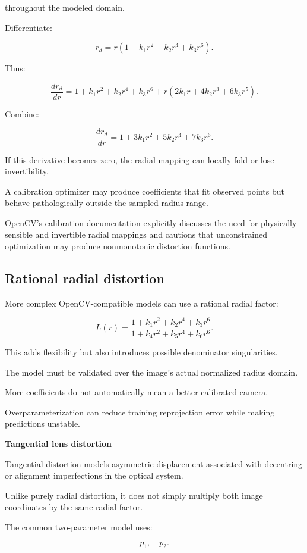 throughout the modeled domain.

Differentiate:

\[
 r_d=r(1+k_1r^2+k_2r^4+k_3r^6).
\]

Thus:

\[
 \frac{dr_d}{dr} = 1+k_1r^2+k_2r^4+k_3r^6 +r(2k_1r+4k_2r^3+6k_3r^5).
\]

Combine:

\[
 \boxed{ \frac{dr_d}{dr} = 1+3k_1r^2+5k_2r^4+7k_3r^6 }.
\]

If this derivative becomes zero, the radial mapping can locally fold or lose invertibility.

A calibration optimizer may produce coefficients that fit observed points but behave pathologically outside the sampled radius range.

OpenCV's calibration documentation explicitly discusses the need for physically sensible and invertible radial mappings and cautions that unconstrained optimization may produce nonmonotonic distortion functions. 

\subsection{Rational radial distortion}\label{02-foundations-ii-ch035-rational-radial-distortion}

More complex OpenCV-compatible models can use a rational radial factor:

\[
 \boxed{ L(r)= \frac{ 1+k_1r^2+k_2r^4+k_3r^6 }{ 1+k_4r^2+k_5r^4+k_6r^6 } }.
\]

This adds flexibility but also introduces possible denominator singularities.

The model must be validated over the image's actual normalized radius domain.

More coefficients do not automatically mean a better-calibrated camera.

Overparameterization can reduce training reprojection error while making predictions unstable.

\textbf{Tangential lens distortion}

Tangential distortion models asymmetric displacement associated with decentring or alignment imperfections in the optical system.

Unlike purely radial distortion, it does not simply multiply both image coordinates by the same radial factor.

The common two-parameter model uses:

\[
 p_1,\quad p_2.
\]

